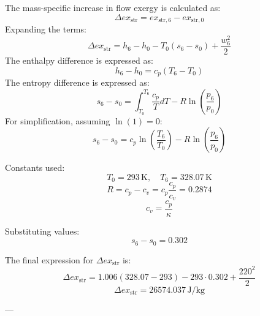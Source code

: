 The mass-specific increase in flow exergy is calculated as:  
\[
\Delta ex_{\text{str}} = ex_{\text{str},6} - ex_{\text{str},0}
\]  
Expanding the terms:  
\[
\Delta ex_{\text{str}} = h_6 - h_0 - T_0 (s_6 - s_0) + \frac{w_6^2}{2}
\]  
The enthalpy difference is expressed as:  
\[
h_6 - h_0 = c_p (T_6 - T_0)
\]  
The entropy difference is expressed as:  
\[
s_6 - s_0 = \int_{T_0}^{T_6} \frac{c_p}{T} dT - R \ln \left( \frac{p_6}{p_0} \right)
\]  
For simplification, assuming \( \ln(1) = 0 \):  
\[
s_6 - s_0 = c_p \ln \left( \frac{T_6}{T_0} \right) - R \ln \left( \frac{p_6}{p_0} \right)
\]  

Constants used:  
\[
T_0 = 293 \, \text{K}, \quad T_6 = 328.07 \, \text{K}
\]  
\[
R = c_p - c_v = c_p \frac{c_p}{c_v} = 0.2874
\]  
\[
c_v = \frac{c_p}{\kappa}
\]  

Substituting values:  
\[
s_6 - s_0 = 0.302
\]  

The final expression for \( \Delta ex_{\text{str}} \) is:  
\[
\Delta ex_{\text{str}} = 1.006 (328.07 - 293) - 293 \cdot 0.302 + \frac{220^2}{2}
\]  
\[
\Delta ex_{\text{str}} = 26574.037 \, \text{J/kg}
\]  

---